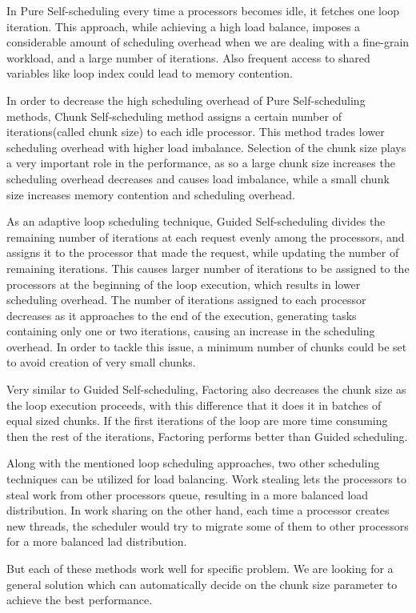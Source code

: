 In Pure Self-scheduling every time a processors becomes idle, it fetches one loop iteration. This approach, while achieving a high load balance, imposes a considerable amount of scheduling overhead when we are dealing with a fine-grain workload, and a large number of iterations. Also frequent access to shared variables like loop index could lead to memory contention\cite{liu1994safe}. 

In order to decrease the high scheduling overhead of Pure Self-scheduling methods, Chunk Self-scheduling method assigns a certain number of iterations(called chunk size) to each idle processor. This method trades lower scheduling overhead with higher load imbalance. Selection of the chunk size plays a very important role in the performance, as so a large chunk size increases the scheduling overhead decreases and causes load imbalance, while a small chunk size increases memory contention and scheduling overhead\cite{liu1994safe}. 

As an adaptive loop scheduling technique, Guided Self-scheduling\cite{polychronopoulos1987guided} divides the remaining number of iterations at each request evenly among the processors, and assigns it to the processor that made the request, while updating the number of remaining iterations. This causes larger number of iterations to be assigned to the processors at the beginning of the loop execution, which results in lower scheduling overhead. The number of iterations assigned to each processor decreases as it approaches to the end of the execution, generating tasks containing only one or two iterations, causing an increase in the scheduling overhead. In order to tackle this issue, a minimum number of chunks could be set to avoid creation of very small chunks\cite{lilja1994exploiting}. 

Very similar to Guided Self-scheduling, Factoring\cite{hummel1992factoring} also decreases the chunk size as the loop execution proceeds, with this difference that it does it in batches of equal sized chunks. If the first iterations of the loop are more time consuming then the rest of the iterations, Factoring performs better than Guided scheduling\cite{mohammed2018experimental}.  


Along with the mentioned loop scheduling approaches, two other scheduling techniques can be utilized for load balancing. Work stealing\cite{blumofe1999scheduling} lets the processors to steal work from other processors queue, resulting in a more balanced load distribution. In work sharing on the other hand, each time a processor creates new threads, the scheduler would try to migrate some of them to other processors for a more balanced lad distribution\cite{blumofe1999scheduling}.



But each of these methods work well for specific problem. We are looking for a general solution which can automatically decide on the chunk size parameter to achieve the best performance.

\vspace{\baselineskip}	
